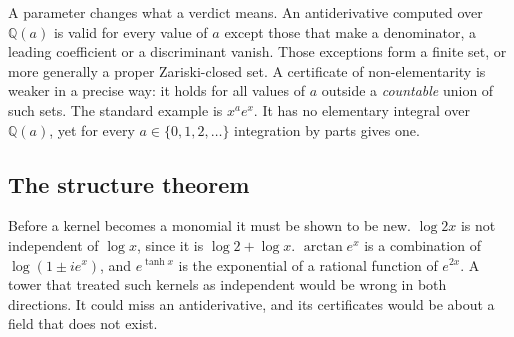 \begin{codepairs}
\end{codepairs}

A parameter changes what a verdict means. An antiderivative computed over
\(\mathbb{Q}(a)\) is valid for every value of \(a\) except those that make a
denominator, a leading coefficient or a discriminant vanish. Those exceptions form
a finite set, or more generally a proper Zariski-closed set. A certificate of
non-elementarity is weaker in a precise way: it holds for all values of \(a\)
outside a \emph{countable} union of such sets. The standard example is
\(x^a e^x\). It has no elementary integral over \(\mathbb{Q}(a)\), yet for every
\(a\in\{0,1,2,\dots\}\) integration by parts gives one.

\subsection{The structure theorem}
\label{ssec:int-structure}

Before a kernel becomes a monomial it must be shown to be new. \(\log 2x\) is not
independent of \(\log x\), since it is \(\log 2+\log x\). \(\arctan e^x\) is a
combination of \(\log(1\pm ie^x)\), and \(e^{\tanh x}\) is the exponential of a
rational function of \(e^{2x}\). A tower that treated such kernels as independent
would be wrong in both directions. It could miss an antiderivative, and its
certificates would be about a field that does not exist.


